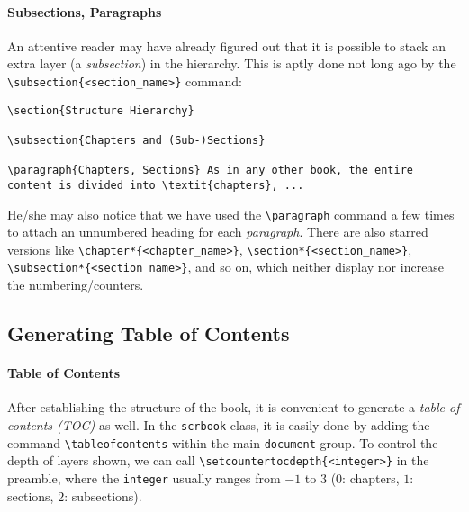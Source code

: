 \paragraph{Subsections, Paragraphs}
An attentive reader may have already figured out that it is possible to stack an extra layer (a \textit{subsection}) in the hierarchy. This is aptly done not long ago by the \texttt{\textbackslash subsection\{<section\_name>\}} command:
\begin{lstlisting}
\section{Structure Hierarchy}

\subsection{Chapters and (Sub-)Sections}

\paragraph{Chapters, Sections} As in any other book, the entire content is divided into \textit{chapters}, ...
\end{lstlisting}
He/she may also notice that we have used the \texttt{\textbackslash paragraph} command a few times to attach an unnumbered heading for each \textit{paragraph}. There are also starred versions like \texttt{\textbackslash chapter*\{<chapter\_name>\}}, \texttt{\textbackslash section*\{<section\_name>\}}, \texttt{\textbackslash subsection*\{<section\_name>\}}, and so on, which neither display nor increase the numbering/counters.

\subsection{Generating Table of Contents}

\paragraph{Table of Contents}
After establishing the structure of the book, it is convenient to generate a \textit{table of contents (TOC)} as well. In the \verb|scrbook| class, it is easily done by adding the command \texttt{\textbackslash tableofcontents} within the main \verb|document| group. To control the depth of layers shown, we can call \texttt{\textbackslash setcounter{tocdepth}\allowbreak\{<integer>\}} in the preamble, where the \verb|integer| usually ranges from $-1$ to $3$ ($0$: chapters, $1$: sections, $2$: subsections).

